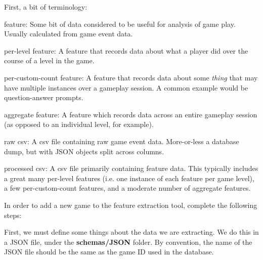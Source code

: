 First, a bit of terminology\+:
\begin{DoxyItemize}
\item feature\+: Some bit of data considered to be useful for analysis of game play. Usually calculated from game event data.
\item per-\/level feature\+: A feature that records data about what a player did over the course of a level in the game.
\item per-\/custom-\/count feature\+: A feature that records data about some {\itshape thing} that may have multiple instances over a gameplay session. A common example would be question-\/answer prompts.
\item aggregate feature\+: A feature which records data across an entire gameplay session (as opposed to an individual level, for example).
\item raw csv\+: A csv file containing raw game event data. More-\/or-\/less a database dump, but with J\+S\+ON objects split across columns.
\item processed csv\+: A csv file primarily containing feature data. This typically includes a great many per-\/level features (i.\+e. one instance of each feature per game level), a few per-\/custom-\/count features, and a moderate number of aggregate features.
\end{DoxyItemize}

In order to add a new game to the feature extraction tool, complete the following steps\+:


\begin{DoxyEnumerate}
\item First, we must define some things about the data we are extracting. We do this in a J\+S\+ON file, under the {\bfseries{schemas/\+J\+S\+ON}} folder. By convention, the name of the J\+S\+ON file should be the same as the game ID used in the database.
\end{DoxyEnumerate}

